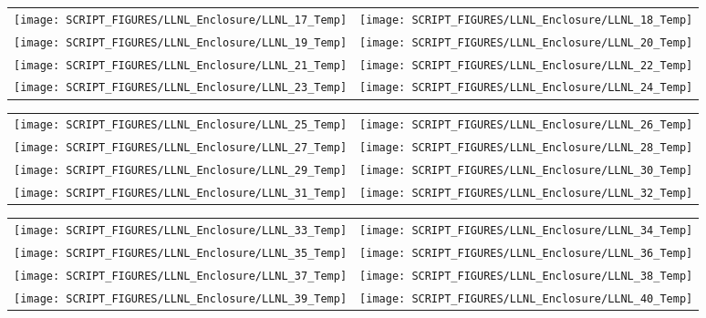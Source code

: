 \begin{figure}[p]
\begin{tabular*}{\textwidth}{l@{\extracolsep{\fill}}r}
 \texttt{[image: SCRIPT\_FIGURES/LLNL\_Enclosure/LLNL\_17\_Temp]} &
 \texttt{[image: SCRIPT\_FIGURES/LLNL\_Enclosure/LLNL\_18\_Temp]} \\
\texttt{[image: SCRIPT\_FIGURES/LLNL\_Enclosure/LLNL\_19\_Temp]} &
 \texttt{[image: SCRIPT\_FIGURES/LLNL\_Enclosure/LLNL\_20\_Temp]} \\
\texttt{[image: SCRIPT\_FIGURES/LLNL\_Enclosure/LLNL\_21\_Temp]} &
\texttt{[image: SCRIPT\_FIGURES/LLNL\_Enclosure/LLNL\_22\_Temp]} \\
\texttt{[image: SCRIPT\_FIGURES/LLNL\_Enclosure/LLNL\_23\_Temp]} &
\texttt{[image: SCRIPT\_FIGURES/LLNL\_Enclosure/LLNL\_24\_Temp]}
\end{tabular*}
\label{LLNL_Enclosure_Temp_3}
\end{figure}

\begin{figure}[p]
\begin{tabular*}{\textwidth}{l@{\extracolsep{\fill}}r}
\texttt{[image: SCRIPT\_FIGURES/LLNL\_Enclosure/LLNL\_25\_Temp]} &
\texttt{[image: SCRIPT\_FIGURES/LLNL\_Enclosure/LLNL\_26\_Temp]} \\
\texttt{[image: SCRIPT\_FIGURES/LLNL\_Enclosure/LLNL\_27\_Temp]} &
\texttt{[image: SCRIPT\_FIGURES/LLNL\_Enclosure/LLNL\_28\_Temp]} \\
\texttt{[image: SCRIPT\_FIGURES/LLNL\_Enclosure/LLNL\_29\_Temp]} &
\texttt{[image: SCRIPT\_FIGURES/LLNL\_Enclosure/LLNL\_30\_Temp]} \\
\texttt{[image: SCRIPT\_FIGURES/LLNL\_Enclosure/LLNL\_31\_Temp]} &
\texttt{[image: SCRIPT\_FIGURES/LLNL\_Enclosure/LLNL\_32\_Temp]}
\end{tabular*}
\label{LLNL_Enclosure_Temp_4}
\end{figure}

\begin{figure}[p]
\begin{tabular*}{\textwidth}{l@{\extracolsep{\fill}}r}
\texttt{[image: SCRIPT\_FIGURES/LLNL\_Enclosure/LLNL\_33\_Temp]} &
\texttt{[image: SCRIPT\_FIGURES/LLNL\_Enclosure/LLNL\_34\_Temp]} \\
\texttt{[image: SCRIPT\_FIGURES/LLNL\_Enclosure/LLNL\_35\_Temp]} &
\texttt{[image: SCRIPT\_FIGURES/LLNL\_Enclosure/LLNL\_36\_Temp]} \\
\texttt{[image: SCRIPT\_FIGURES/LLNL\_Enclosure/LLNL\_37\_Temp]} &
\texttt{[image: SCRIPT\_FIGURES/LLNL\_Enclosure/LLNL\_38\_Temp]} \\
\texttt{[image: SCRIPT\_FIGURES/LLNL\_Enclosure/LLNL\_39\_Temp]} &
\texttt{[image: SCRIPT\_FIGURES/LLNL\_Enclosure/LLNL\_40\_Temp]}
\end{tabular*}
\label{LLNL_Enclosure_Temp_5}
\end{figure}

